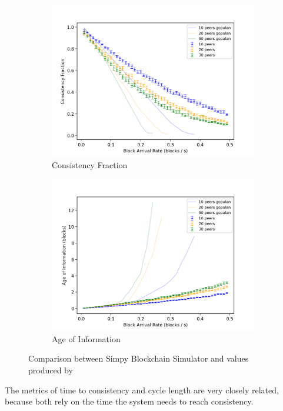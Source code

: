 \begin{figure}[tbp]
\begin{subfigure}[b]{0.5\textwidth}
		\includegraphics[width=\textwidth]{figures/gopalan_figures/consistency_fraction.png}
		\caption{ Consistency Fraction}
		\label{fig:gopalan_cf}
	\end{subfigure}
	\hfill
	\begin{subfigure}[b]{0.5\textwidth}
		\includegraphics[width=\textwidth]{figures/gopalan_figures/age_of_information.png}
		\caption{ Age of Information}
		\label{fig:gopalan_aof}
	\end{subfigure}
	\caption{Comparison between Simpy Blockchain Simulator and values produced by~}
\end{figure} 
The metrics of time to consistency and cycle length are very closely related, because both rely on the time the system needs to reach consistency.
